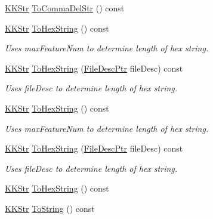 \begin{DoxyCompactItemize}
\hyperlink{class_k_k_b_1_1_k_k_str}{K\+K\+Str} \hyperlink{class_k_k_m_l_l_1_1_feature_num_list_abfd2d7bc9db5133fbe02577f1d82891c}{To\+Comma\+Del\+Str} () const 
\item 
\hyperlink{class_k_k_b_1_1_k_k_str}{K\+K\+Str} \hyperlink{class_k_k_m_l_l_1_1_feature_num_list_a8f8fd3992412738dc97e0c55bb74fdaa}{To\+Hex\+String} () const 
\begin{DoxyCompactList}\small\item\em Uses \textquotesingle{}max\+Feature\+Num to determine length of hex string. \end{DoxyCompactList}\item 
\hyperlink{class_k_k_b_1_1_k_k_str}{K\+K\+Str} \hyperlink{class_k_k_m_l_l_1_1_feature_num_list_a084f4607dce278ed36483e566e52e872}{To\+Hex\+String} (\hyperlink{namespace_k_k_m_l_l_aa0d0b6ab4ec18868a399b8455b05d914}{File\+Desc\+Ptr} file\+Desc) const 
\begin{DoxyCompactList}\small\item\em Uses \textquotesingle{}file\+Desc\textquotesingle{} to determine length of hex string. \end{DoxyCompactList}\item 
\hyperlink{class_k_k_b_1_1_k_k_str}{K\+K\+Str} \hyperlink{class_k_k_m_l_l_1_1_feature_num_list_a883ab8491ddd6c8886ae4937cb21526e}{To\+Hex\+String} () const 
\begin{DoxyCompactList}\small\item\em Uses \textquotesingle{}max\+Feature\+Num to determine length of hex string. \end{DoxyCompactList}\item 
\hyperlink{class_k_k_b_1_1_k_k_str}{K\+K\+Str} \hyperlink{class_k_k_m_l_l_1_1_feature_num_list_a5f850dfdce7bac38e70f336461ac350c}{To\+Hex\+String} (\hyperlink{namespace_k_k_m_l_l_aa0d0b6ab4ec18868a399b8455b05d914}{File\+Desc\+Ptr} file\+Desc) const 
\begin{DoxyCompactList}\small\item\em Uses \textquotesingle{}file\+Desc\textquotesingle{} to determine length of hex string. \end{DoxyCompactList}\item 
\hyperlink{class_k_k_b_1_1_k_k_str}{K\+K\+Str} \hyperlink{class_k_k_m_l_l_1_1_feature_num_list_a8f8fd3992412738dc97e0c55bb74fdaa}{To\+Hex\+String} () const 
\item 
\hyperlink{class_k_k_b_1_1_k_k_str}{K\+K\+Str} \hyperlink{class_k_k_m_l_l_1_1_feature_num_list_a605c16651ab570da526bd3648e3ec654}{To\+String} () const 

\end{DoxyCompactItemize}
